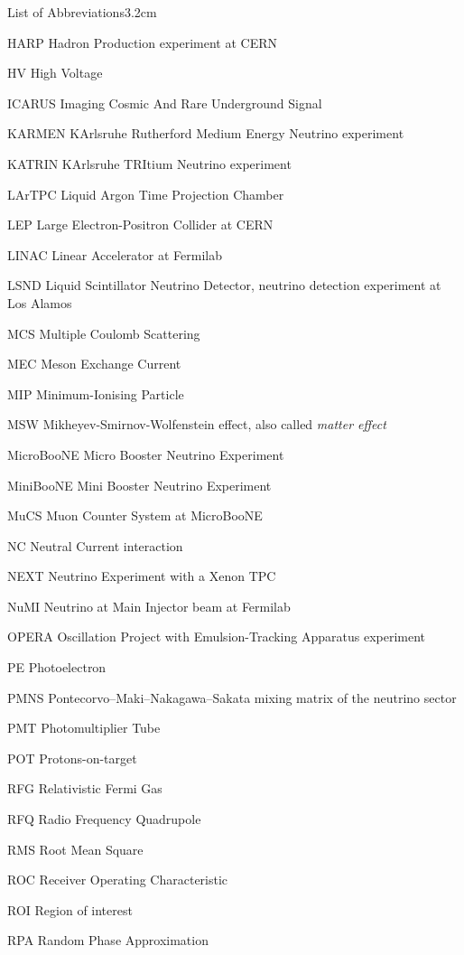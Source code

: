 \begin{mclistof}{List of Abbreviations}{3.2cm}
\item[HARP] Hadron Production experiment at CERN
\item[HV] High Voltage
\item[ICARUS] Imaging Cosmic And Rare Underground Signal
\item[KARMEN] KArlsruhe Rutherford Medium Energy Neutrino experiment
\item[KATRIN] KArlsruhe TRItium Neutrino experiment
\item[LArTPC] Liquid Argon Time Projection Chamber
\item[LEP] Large Electron-Positron Collider at CERN
\item[LINAC] Linear Accelerator at Fermilab
\item[LSND] Liquid Scintillator Neutrino Detector, neutrino detection experiment at Los Alamos
\item[MCS] Multiple Coulomb Scattering
\item[MEC] Meson Exchange Current
\item[MIP] Minimum-Ionising Particle
\item[MSW] Mikheyev-Smirnov-Wolfenstein effect, also called \emph{matter effect}
\item[MicroBooNE] Micro Booster Neutrino Experiment
\item[MiniBooNE] Mini Booster Neutrino Experiment
\item[MuCS] Muon Counter System at MicroBooNE
\item[NC] Neutral Current interaction
\item[NEXT] Neutrino Experiment with a Xenon TPC
\item[NuMI] Neutrino at Main Injector beam at Fermilab
\item[OPERA] Oscillation Project with Emulsion-Tracking Apparatus experiment
\item[PE] Photoelectron
\item[PMNS] Pontecorvo–Maki–Nakagawa–Sakata mixing matrix of the neutrino sector
\item[PMT] Photomultiplier Tube
\item[POT] Protons-on-target
\item[RFG] Relativistic Fermi Gas
\item[RFQ] Radio Frequency Quadrupole
\item[RMS] Root Mean Square
\item[ROC] Receiver Operating Characteristic
\item[ROI] Region of interest
\item[RPA] Random Phase Approximation

\end{mclistof}
